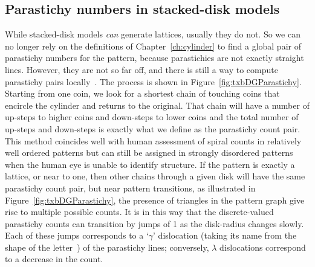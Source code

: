 \subsection{Parastichy numbers in stacked-disk models}
While stacked-disk models \textit{can} generate lattices, usually they do not. 
So we can no longer rely on the  definitions of Chapter~\ref{ch:cylinder}
to find a global pair of parastichy numbers for the pattern, because  parastichies are not exactly straight lines.  However, they are not so far off, and there is still a way to compute parastichy pairs locally~\autocite{goleFibonacciQuasisymmetricPhyllotaxis2016}.
The process is shown in Figure~\ref{fig:txbDGParastichy}. Starting from one coin, we look for a shortest chain of touching coins that encircle the cylinder and returns to the original. That chain will have a number of up-steps to higher coins and down-steps to lower coins and the total number of up-steps and down-steps is exactly what we define as the parastichy count pair. 
%
This method coincides well with human assessment of spiral counts in relatively well ordered patterns but can still be assigned in strongly disordered patterns when the human eye is unable to identify structure. 
%	 
	 If the pattern is exactly a lattice, or near to one,
	 then other chains  through a given disk will have the same parastichy count pair, but near pattern transitions, as illustrated in Figure~\ref{fig:txbDGParastichy}, the presence of triangles in the pattern graph give rise to  multiple possible  counts. It is in this way that the discrete-valued parastichy counts can transition by jumps of 1 as the disk-radius changes slowly. 
	 Each of these jumps corresponds to a `$\gamma$' dislocation (taking its name from the shape of the letter~\cite{zagorska-marekPhyllotacticPatternsTransitions1985}) of the parastichy lines; conversely, $\lambda$ dislocations correspond to a decrease in the count.


